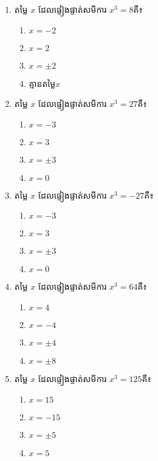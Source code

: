 \begin{enumerate}
\item តម្លៃ $x$ ដែលផ្ទៀងផ្ទាត់សមីការ $x^3=8$គឺ៖
\begin{multicols}{4}
\begin{enumerate}[label=\alph*.]
	\item $x=-2$
	\item $x=2$
	\item $x=\pm 2$
	\item គ្មានតម្លៃ$x$
\end{enumerate}
\end{multicols}

\item តម្លៃ $x$ ដែលផ្ទៀងផ្ទាត់សមីការ $x^3=27$គឺ៖
\begin{multicols}{4}
\begin{enumerate}[label=\alph*.]
	\item $x=-3$
	\item $x=3$
	\item $x=\pm 3$
	\item $x=0$
\end{enumerate}
\end{multicols}

\item តម្លៃ $x$ ដែលផ្ទៀងផ្ទាត់សមីការ $x^3=-27$គឺ៖
\begin{multicols}{4}
\begin{enumerate}[label=\alph*.]
	\item $x=-3$
	\item $x=3$
	\item $x=\pm 3$
	\item $x=0$
\end{enumerate}
\end{multicols}

\item តម្លៃ $x$ ដែលផ្ទៀងផ្ទាត់សមីការ $x^3=64$គឺ៖
\begin{multicols}{4}
\begin{enumerate}[label=\alph*.]
	\item $x=4$
	\item $x=-4$
	\item $x=\pm 4$
	\item $x=\pm 8$
\end{enumerate}
\end{multicols}

\item តម្លៃ $x$ ដែលផ្ទៀងផ្ទាត់សមីការ $x^3=125$គឺ៖
\begin{multicols}{4}
\begin{enumerate}[label=\alph*.]
	\item $x=15$
	\item $x=-15$
	\item $x=\pm 5$
	\item $x=5$
\end{enumerate}
\end{multicols}


\end{enumerate}
